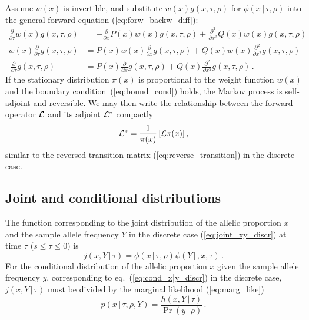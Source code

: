 \documentclass[preprint]{elsarticle}
\newcommand\given{{\,|\,}}
\newcommand\y{\ensuremath{Y}}
\begin{document}
Assume $w(x)$ is invertible, and substitute $w(x)g(x,\tau,\rho)$ for $\phi(x\given\tau,\rho)$ into the general forward equation (\ref{eq:forw_backw_diff}): 
\begin{equation}
\begin{split}
\frac{\partial}{\partial \tau} w(x)g(x,\tau,\rho)&=-\frac{\partial}{\partial x}P(x)w(x)g(x,\tau,\rho)+\frac{\partial^2}{\partial x^2}Q(x)w(x) g(x,\tau,\rho)\\
w(x)\frac{\partial}{\partial \tau}g(x,\tau,\rho)&=P(x)w(x)\frac{\partial}{\partial x}g(x,\tau,\rho) +Q(x)w(x)\frac{\partial^2}{\partial x^2}g(x,\tau,\rho)\\\
\frac{\partial}{\partial \tau}g(x,\tau,\rho)&=P(x)\frac{\partial}{\partial x}g(x,\tau,\rho)+Q(x)\frac{\partial^2}{\partial x^2}g(x,\tau,\rho)\,.
\end{split}
\end{equation}
If the stationary distribution $\pi(x)$ is proportional to the weight function $w(x)$ and the boundary condition~(\ref{eq:bound_cond}) holds, the Markov process is self-adjoint and reversible. We may then write the relationship between the forward operator ${\cal L}$ and its adjoint ${\cal L}^{*}$ compactly
\begin{equation}\label{compact}
{\cal L}^{*}=\frac1{\pi(x)}\left[{\cal L}\pi(x)\right],
\end{equation}
similar to the reversed transition matrix (\ref{eq:reverse_transition}) in the discrete case.


\subsection{Joint and conditional distributions}

The function corresponding to the joint distribution of the allelic proportion $x$ and the sample allele frequency $\y$ in the discrete case  (\ref{eq:joint_xy_discr}) at time $\tau$ ($s \le \tau \le 0$) is
\begin{equation}\label{eq:joint_x_y}
j(x,\y \given \tau)= \phi(x\given \tau,\rho)\psi(\y\given,x,\tau)\,.
\end{equation}
For the conditional distribution of the allelic proportion $x$ given the sample allele frequency $y$, corresponding to eq.~(\ref{eq:cond_x|y_discr}) in the discrete case, $j(x,\y \given \tau)$ must be divided by the marginal likelihood (\ref{eq:marg_like})
\begin{equation}\label{eq:cond_x|y}
p(x\given \tau,\rho,\y)= \frac{h(x,\y\given \tau)}{\Pr(y\given \rho)}\,.
\end{equation}
\end{document}
